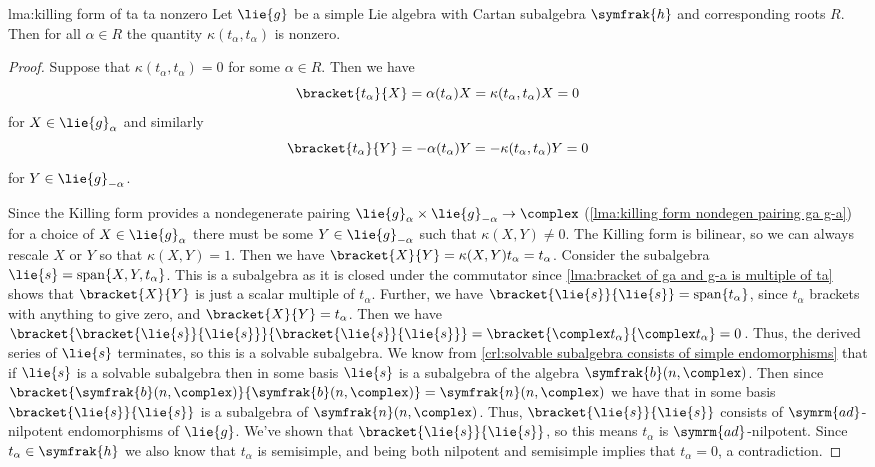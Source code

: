 \documentclass[fleqn]{NotesClass}
\DeclareMathOperator{\Span}{span}
\newcommand{\ad}{\symrm{ad}}
\newcommand{\borelLie}{\symfrak{b}}
\newcommand{\nilpotentLie}{\symfrak{n}}
\newcommand{\csa}{\symfrak{h}}
\begin{document}
    \begin{lma}{}{lma:killing form of ta ta nonzero}
        Let \(\lie{g}\) be a simple Lie algebra with Cartan subalgebra \(\csa\) and corresponding roots \(R\).
        Then for all \(\alpha \in R\) the quantity \(\kappa(t_\alpha, t_\alpha)\) is nonzero.
        \begin{proof}
            Suppose that \(\kappa(t_\alpha, t_\alpha) = 0\) for some \(\alpha \in R\).
            Then we have
            \begin{equation}
                \bracket{t_\alpha}{X} = \alpha(t_\alpha)X = \kappa(t_\alpha, t_\alpha)X = 0
            \end{equation}
            for \(X \in \lie{g}_\alpha\) and similarly
            \begin{equation}
                \bracket{t_\alpha}{Y} = -\alpha(t_\alpha)Y = -\kappa(t_\alpha, t_\alpha)Y = 0
            \end{equation}
            for \(Y \in \lie{g}_{-\alpha}\).
            
            Since the Killing form provides a nondegenerate pairing \(\lie{g}_\alpha \times \lie{g}_{-\alpha} \to \complex\) (\cref{lma:killing form nondegen pairing ga g-a}) for a choice of \(X \in \lie{g}_{\alpha}\) there must be some \(Y \in \lie{g}_{-\alpha}\) such that \(\kappa(X, Y) \ne 0\).
            The Killing form is bilinear, so we can always rescale \(X\) or \(Y\) so that \(\kappa(X, Y) = 1\).
            Then we have \(\bracket{X}{Y} = \kappa(X, Y)t_\alpha = t_\alpha\).
            Consider the subalgebra \(\lie{s} = \Span\{X, Y, t_\alpha\}\).
            This is a subalgebra as it is closed under the commutator since \cref{lma:bracket of ga and g-a is multiple of ta} shows that \(\bracket{X}{Y}\) is just a scalar multiple of \(t_\alpha\).
            Further, we have \(\bracket{\lie{s}}{\lie{s}} = \Span\{t_\alpha\}\), since \(t_\alpha\) brackets with anything to give zero, and \(\bracket{X}{Y} = t_\alpha\).
            Then we have \(\bracket{\bracket{\lie{s}}{\lie{s}}}{\bracket{\lie{s}}{\lie{s}}} = \bracket{\complex t_\alpha}{\complex t_\alpha} = 0\).
            Thus, the derived series of \(\lie{s}\) terminates, so this is a solvable subalgebra.
            We know from \cref{crl:solvable subalgebra consists of simple endomorphisms} that if \(\lie{s}\) is a solvable subalgebra then in some basis \(\lie{s}\) is a subalgebra of the algebra \(\borelLie(n, \complex)\).
            Then since \(\bracket{\borelLie(n, \complex)}{\borelLie(n, \complex)} = \nilpotentLie(n, \complex)\) we have that in some basis \(\bracket{\lie{s}}{\lie{s}}\) is a subalgebra of \(\nilpotentLie(n, \complex)\).
            Thus, \(\bracket{\lie{s}}{\lie{s}}\) consists of \(\ad\)-nilpotent endomorphisms of \(\lie{g}\).
            We've shown that \(\bracket{\lie{s}}{\lie{s}}\), so this means \(t_\alpha\) is \(\ad\)-nilpotent.
            Since \(t_\alpha \in \csa\) we also know that \(t_\alpha\) is semisimple, and being both nilpotent and semisimple implies that \(t_\alpha = 0\), a contradiction.
        \end{proof}
    \end{lma}
    
\end{document}
